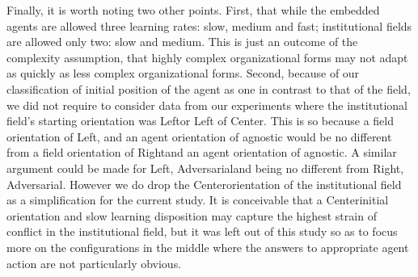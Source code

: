 \documentclass[12pt,letterpaper]{article}
\begin{document}
Finally, it is worth noting two other points. First, that while the embedded agents are allowed three learning rates: slow, medium and fast; institutional fields are allowed only two: slow and medium. This is just an outcome of the complexity assumption,  that highly complex organizational forms may not adapt as quickly as less complex organizational forms. Second, because of our classification of initial position of the agent as one in contrast to that of the field, we did not require to consider data from our experiments where the institutional field's starting orientation was \textquotesingle Left\textquotesingle  or \textquotesingle Left of Center\textquotesingle . This is so because a field orientation of \textquotesingle Left\textquotesingle , and an agent orientation of agnostic would be no different from a field orientation of \textquotesingle Right\textquotesingle  and an agent orientation of agnostic. A similar argument could be made for \textquotesingle Left, Adversarial\textquotesingle  and being no different from \textquotesingle Right, Adversarial\textquotesingle . However we do drop the \textquotesingle Center\textquotesingle  orientation of the institutional field as a simplification for the current study. It is conceivable that a \textquotesingle Center\textquotesingle  initial orientation and slow learning disposition may capture the highest strain of conflict in the institutional field, but it was left out of this study so as to focus more on the configurations in the middle where the answers to appropriate agent action are not particularly obvious.
\end{document}
